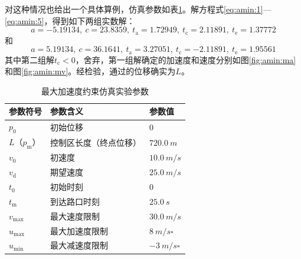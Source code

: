 对这种情况也给出一个具体算例，仿真参数如表\ref{tab:amin:param}。解方程式\eqref{eq:amin:1}---\eqref{eq:amin:5}，得到如下两组实数解：
\[a = -5.19134,\ c = 23.8359,\ t_\mathrm{a} = 1.72949,\ t_\mathrm{c} = 2.11891,\ t_\mathrm{e} = 1.37772\]
和
\[a = 5.19134,\ c = 36.1641,\ t_\mathrm{a} = 3.27051,\ t_\mathrm{c} = -2.11891,\ t_\mathrm{e} = 1.95561\]
其中第二组解$t_\mathrm{c}<0$，舍弃，第一组解确定的加速度和速度分别如图\ref{fig:amin:ma}和图\ref{fig:amin:mv}。经检验，通过的位移确实为$L$。
\begin{table}[htbp]
\centering
\caption{最大加速度约束仿真实验参数}
\label{tab:amin:param}
\begin{tabular}{lll}
\toprule[1.5pt]
参数符号 & 参数含义 & 参数值 \\
\midrule[1pt]
$p_0$ & 初始位移 & $0$ \\
$L$（$p_\mathrm{m}$） & 控制区长度（终点位移） & $\SI{720.0}{m}$ \\
$v_0$ & 初速度 & $\SI{10.0}{m\per s}$ \\
$v_\mathrm{d}$ & 期望速度 & $\SI{25.0}{m\per s}$ \\
$t_0$ & 初始时刻 & $0$ \\
$t_\mathrm{m}$ & 到达路口时刻 & $\SI{25.0}{s}$ \\
$v_{\max}$ & 最大速度限制 & $\SI{30.0}{m\per s}$ \\
$u_{\max}$ & 最大加速度限制 & $\SI{8}{m\per s\square}$ \\
$u_{\min}$ & 最大减速度限制 & $-\SI{3}{m\per s\square}$ \\
\bottomrule[1.5pt]
\end{tabular}
\end{table}

